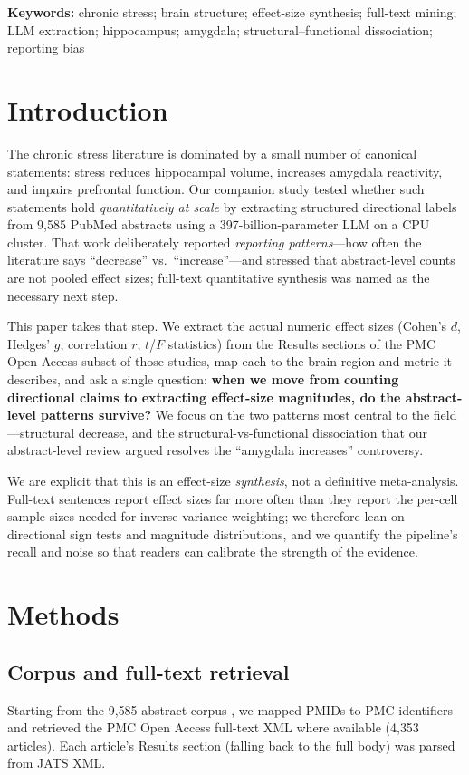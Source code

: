 \documentclass[11pt]{article}
\begin{document}
\medskip
\noindent\textbf{Keywords:} chronic stress; brain structure; effect-size
synthesis; full-text mining; LLM extraction; hippocampus; amygdala;
structural--functional dissociation; reporting bias

\section{Introduction}

The chronic stress literature is dominated by a small number of canonical
statements: stress reduces hippocampal volume, increases amygdala reactivity,
and impairs prefrontal function. Our companion study \cite{kang2026scoping}
tested whether such statements hold \emph{quantitatively at scale} by extracting
structured directional labels from 9{,}585 PubMed abstracts using a
397-billion-parameter LLM on a CPU cluster. That work deliberately reported
\emph{reporting patterns}---how often the literature says ``decrease'' vs.\
``increase''---and stressed that abstract-level counts are not pooled effect
sizes; full-text quantitative synthesis was named as the necessary next step.

This paper takes that step. We extract the actual numeric effect sizes (Cohen's
$d$, Hedges' $g$, correlation $r$, $t$/$F$ statistics) from the Results sections
of the PMC Open Access subset of those studies, map each to the brain region and
metric it describes, and ask a single question: \textbf{when we move from
counting directional claims to extracting effect-size magnitudes, do the
abstract-level patterns survive?} We focus on the two patterns most central to
the field---structural decrease, and the structural-vs-functional dissociation
that our abstract-level review argued resolves the ``amygdala increases''
controversy.

We are explicit that this is an effect-size \emph{synthesis}, not a definitive
meta-analysis. Full-text sentences report effect sizes far more often than they
report the per-cell sample sizes needed for inverse-variance weighting; we
therefore lean on directional sign tests and magnitude distributions, and we
quantify the pipeline's recall and noise so that readers can calibrate the
strength of the evidence.

\section{Methods}

\subsection{Corpus and full-text retrieval}
Starting from the 9{,}585-abstract corpus \cite{kang2026scoping}, we mapped
PMIDs to PMC identifiers and retrieved the PMC Open Access full-text XML where
available (4{,}353 articles). Each article's Results section (falling back to the
full body) was parsed from JATS XML.
\end{document}
